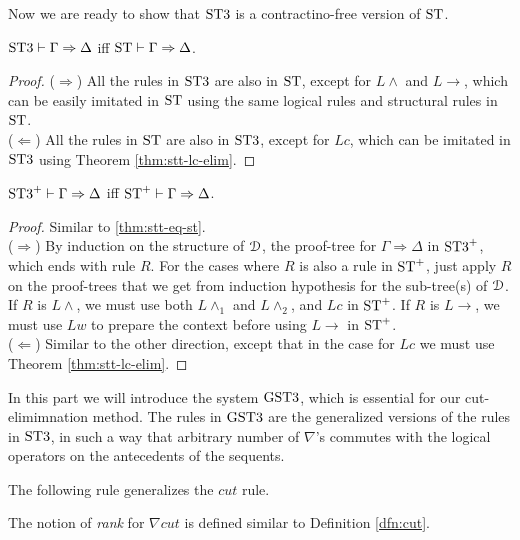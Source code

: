 \documentclass[10pt,a4paper]{amsart}
\begin{document}
Now we are ready to show that $\stt$ is a contractino-free version of $\st$.

\begin{thm}\label{thm:stt-eq-st} $\stt \vdash \Gamma \Rightarrow \Delta$ iff $\st \vdash \Gamma \Rightarrow \Delta$.
\end{thm}
\begin{proof}
	($\Rightarrow$) All the rules in $\stt$ are also in $\st$, except for $L \wedge$ and $L \rightarrow$, which can be easily imitated in $\st$ using the same logical rules and structural rules in $\st$. \\
	($\Leftarrow$) All the rules in $\st$ are also in $\stt$, except for $Lc$, which can be imitated in $\stt$ using Theorem \ref{thm:stt-lc-elim}.
\end{proof}

\begin{thm}\label{thm:sttp-eq-stp}
	$\stt^+ \vdash \Gamma \Rightarrow \Delta$ iff $\st^+ \vdash \Gamma \Rightarrow \Delta$.
\end{thm}
\begin{proof}
	Similar to \ref{thm:stt-eq-st}.\\
	($\Rightarrow$) By induction on the structure of $\D$, the proof-tree for $\Gamma \Rightarrow \Delta$ in $\stt^+$, which ends with rule $R$.
	For the cases where $R$ is also a rule in $\st^+$, just apply $R$ on the proof-trees that we get from induction hypothesis for the sub-tree(s) of $\D$. If $R$ is $L \wedge$, we must use both $L \wedge_1$ and $L \wedge_2$, and $Lc$ in $\st^+$. If $R$ is $L \rightarrow$, we must use $Lw$ to prepare the context before using $L \rightarrow$ in $\st^+$.\\
	($\Leftarrow$) Similar to the other direction, except that in the case for $Lc$ we must use Theorem \ref{thm:stt-lc-elim}.
\end{proof}

In this part we will introduce the system $\gstt$, which is essential for our cut-elimimnation method. The rules in $\gstt$ are the generalized versions of the rules in $\stt$, in such a way that arbitrary number of $\nabla$'s commutes with the logical operators on the antecedents of the sequents.

\begin{dfn}
The following rule generalizes the $cut$ rule.
\begin{center}
  \begin{prooftree}
  \end{prooftree}
\end{center}
The notion of \emph{rank} for $\nabla cut$ is defined similar to Definition \ref{dfn:cut}.
\end{dfn}
\end{document}
